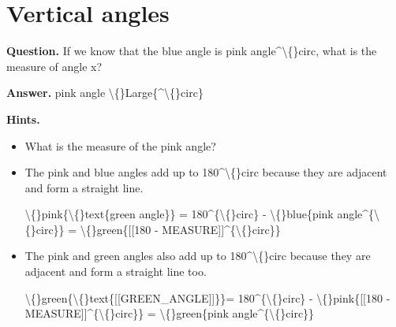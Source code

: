 \documentclass{article}
\begin{document}
\section*{Vertical angles}
\textbf{Question.} If we know that the blue angle is pink angle\textasciicircum{}\textbackslash\{\}circ,
                what is the measure of angle x?

\textbf{Answer.} pink angle \textbackslash\{\}Large\{\textasciicircum{}\textbackslash\{\}circ\}

\textbf{Hints.}
\begin{itemize}
  \item What is the measure of the pink angle?
  \item The pink and blue angles add up to 180\textasciicircum{}\textbackslash\{\}circ because they are adjacent and form a straight line.
            
                \textbackslash\{\}pink\{\textbackslash\{\}text\{green angle\}\} = 180\textasciicircum{}\{\textbackslash\{\}circ\} - \textbackslash\{\}blue\{pink angle\textasciicircum{}\{\textbackslash\{\}circ\}\} = \textbackslash\{\}green\{[[180 - MEASURE]]\textasciicircum{}\{\textbackslash\{\}circ\}\}
  \item The pink and green angles also add up to 180\textasciicircum{}\textbackslash\{\}circ because they are adjacent and form a straight line too.
            
                \textbackslash\{\}green\{\textbackslash\{\}text\{[[GREEN\_ANGLE]]\}\}= 180\textasciicircum{}\{\textbackslash\{\}circ\} - \textbackslash\{\}pink\{[[180 - MEASURE]]\textasciicircum{}\{\textbackslash\{\}circ\}\} = \textbackslash\{\}green\{pink angle\textasciicircum{}\{\textbackslash\{\}circ\}\}
\end{itemize}
\end{document}
